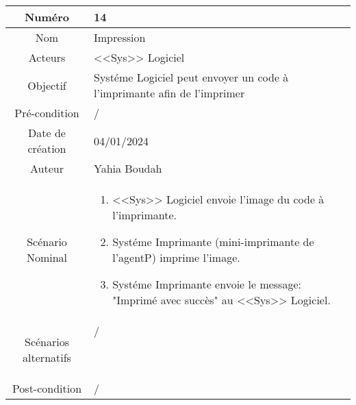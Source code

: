 



\begin{tabular}{ |c|p{12cm}| }
    \hline
    Numéro & 14 \\
    \hline
    Nom & Impression \\
    \hline
    Acteurs & <<Sys>> Logiciel \\ 
    \hline
    Objectif & Systéme Logiciel peut envoyer un code à l'imprimante afin de l'imprimer \\ 
    \hline
    Pré-condition & / \\
    \hline
    Date de création & 04/01/2024 \\
    \hline
    Auteur & Yahia Boudah \\
    \hline
    Scénario Nominal & \begin{enumerate}
        \item <<Sys>> Logiciel envoie l'image du code à l'imprimante.
        \item Systéme Imprimante (mini-imprimante de l'agentP) imprime l'image.
        \item Systéme Imprimante envoie le message: "Imprimé avec succès" au <<Sys>> Logiciel.
    \end{enumerate} \\
    \hline
    Scénarios alternatifs & \begin{description}
        \item[/]
    \end{description} \\
    \hline
    Post-condition & / \\
    \hline
\end{tabular}
